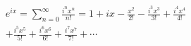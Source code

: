 \documentclass[preview]{standalone}
\begin{document}
\begin{align*}
e^{ix} = \sum_{n=0}^{\infty} \frac{i^nx^n}{n!} = 1 + ix - \frac{x^2}{2!} - \frac{i^3x^3}{3!} + \frac{i^4x^4}{4!} \\ + \frac{i^5x^5}{5!}+ \frac{i^6x^6}{6!} + \frac{i^7x^7}{7!} + \cdots
\end{align*}
\end{document}
